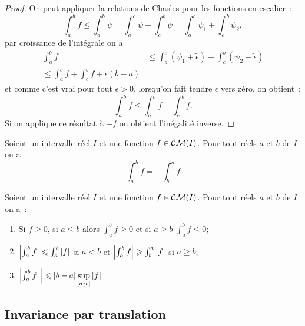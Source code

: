 \begin{proof}
  On peut appliquer la relations de Chasles pour les fonctions en escalier~:
  \begin{equation}
    \int_a^b f \leqslant \int_a^b \psi = \int_a^c \psi + \int_c^b \psi=
    \int_a^c \psi_1 + \int_c^b \psi_2,
  \end{equation}
  par croissance de l'intégrale on a
  \begin{align*}
    \int_a^b f & \leqslant \int_a^c (\psi_1 + \tilde{\epsilon})  + \int_c^b
    (\psi_2 + \tilde{\epsilon}) \\
    \leqslant \int_a^c f + \int_c^b f + \epsilon(b-a)
  \end{align*}
  et comme c'est vrai pour tout \(\epsilon >0\), lorsqu'on fait tendre
  \(\epsilon\) vers zéro, on obtient~:
  \begin{equation}
    \int_a^b f \leqslant \int_a^c f + \int_c^b f.
  \end{equation}
  Si on applique ce résultat à \(-f\) on obtient l'inégalité inverse.
\end{proof}

\begin{prop}
  Soient un intervalle réel \(I\) et une fonction \(f \in \mathcal{CM}(I)\). Pour tout
  réels \(a\) et \(b\) de \(I\) on a
  \begin{equation}
    \int_a^b f = - \int_b^a f
  \end{equation}
\end{prop}

\begin{theo}
  Soient un intervalle réel \(I\) et une fonction \(f \in \mathcal{CM}(I)\). Pour tout
  réels \(a\) et \(b\) de \(I\) on a~:
  \begin{enumerate}
    \item Si \(f \geqslant 0\), si \(a \leqslant b\) alors \(\int_a^bf
      \geqslant 0\) et si \(a \geqslant b\) \(\int_a^b f \leqslant 0\);
    \item \(\left\lvert\int_a^b f\right\rvert \leqslant \int_a^b \left\lvert f\right\rvert\) si \(a<b\) et
      \(\left\lvert\int_a^b f\right\rvert \geqslant \int_b^a \left\lvert f\right\rvert\) si \(a \geqslant b\);
    \item \(\left\lvert\int_a^b f~\right\rvert \leqslant \left\lvert b-a\right\rvert
      \sup\limits_{\left[ a \, ; {} b \right]} \left\lvert f\right\rvert\)
  \end{enumerate}
\end{theo}

\subsection{Invariance par translation}

